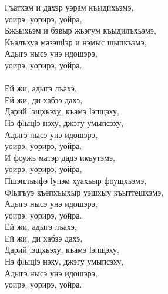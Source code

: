 \documentclass[a4paper,12pt]{book}
\newcommand{\1}[1]{\textbf{\emph{#1}}} %
\newcommand{\2}[1]{\textbf{[#1]}} %
\newcommand{\3}[1]{\fontsize{11pt}{0cm}\textbf{\emph{#1}}} %
\newcommand{\4}[1]{\fontsize{10pt}{0cm}\emph{#1}}	%
\newcommand{\5}[1]{\textbf{/#1/}} %
\newcommand{\6}[1]{\textbf{[#1]}} %
\newcommand{\7}[1]{\fontsize{12pt}{0cm}\emph{#1}} %
\newcommand{\8}[1]{\fontsize{12pt}{0cm}`#1'} %
\newcommand{\9}[1]{\fontsize{12pt}{0cm}(lit. `#1')} %
\begin{document}
Гъатхэм и дахэр уэрам къыдихьэмэ,\\
уоирэ, уорирэ, уойра,\\
Бжьыхьэм и бэвыр жьэгум къыдилъхьэмэ,\\
Къалъхуа мазэщlэр и нэмыс щыпкъэмэ,\\
Адыгэ нысэ унэ идошэрэ,\\
уоирэ, уорирэ, уойра.\\
\\
Ей жи, адыгэ лъахэ,\\
Ей жи, ди хабзэ дахэ,\\
Дарий lэщхьэху, къамэ lэпщэху,\\
Нэ фlыцlэ нэху, джэгу умыпсэху,\\
Адыгэ нысэ унэ идошэрэ,\\
уоирэ, уорирэ, уойра.\\

И фоужь матэр дадэ икъутэмэ,\\
уоирэ, уорирэ, уойра,\\
Пшэплъыфэ lупэм хуахьыр фоущхьэмэ,\\
Фlыгъуэ къепхъыхыр уэшхыу къыттешхэмэ,\\
Адыгэ нысэ унэ идошэрэ,\\
уоирэ, уорирэ, уойра.\\

Ей жи, адыгэ лъахэ,\\
Ей жи, ди хабзэ дахэ,\\
Дарий lэщхьэху, къамэ lэпщэху,\\
Нэ фlыцlэ нэху, джэгу умыпсэху,\\
Адыгэ нысэ унэ идошэрэ,\\
уоирэ, уорирэ, уойра.\\
\end{document}
